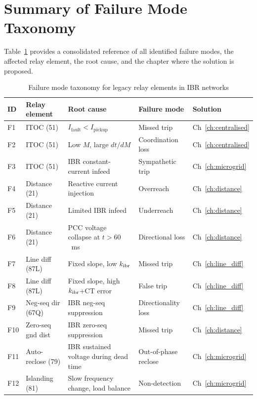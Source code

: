 \section{Summary of Failure Mode Taxonomy}
\label{sec:ch3_taxonomy}

Table~\ref{tab:ch3_failure_modes} provides a consolidated reference of all
identified failure modes, the affected relay element, the root cause,
and the chapter where the solution is proposed.

\begin{table}[htbp]
\caption{Failure mode taxonomy for legacy relay elements in IBR networks}
\label{tab:ch3_failure_modes}
\small
\begin{tabularx}{\textwidth}{@{}lp{2.5cm}p{4.5cm}p{2.5cm}l@{}}
\toprule
ID & Relay element & Root cause & Failure mode & Solution \\
\midrule
F1 & ITOC (51) & $I_\mathrm{fault} < I_\mathrm{pickup}$ & Missed trip & Ch~\ref{ch:centralised} \\
F2 & ITOC (51) & Low $M$, large $dt/dM$ & Coordination loss & Ch~\ref{ch:centralised} \\
F3 & ITOC (51) & IBR constant-current infeed & Sympathetic trip & Ch~\ref{ch:microgrid} \\
F4 & Distance (21) & Reactive current injection & Overreach & Ch~\ref{ch:distance} \\
F5 & Distance (21) & Limited IBR infeed & Underreach & Ch~\ref{ch:distance} \\
F6 & Distance (21) & PCC voltage collapse at $t > 60$~ms & Directional loss & Ch~\ref{ch:distance} \\
F7 & Line diff (87L) & Fixed slope, low $k_{\mathrm{ibr}}$ & Missed trip & Ch~\ref{ch:line_diff} \\
F8 & Line diff (87L) & Fixed slope, high $k_{\mathrm{ibr}}$+CT error & False trip & Ch~\ref{ch:line_diff} \\
F9 & Neg-seq dir (67Q) & IBR neg-seq suppression & Directionality loss & Ch~\ref{ch:line_diff} \\
F10 & Zero-seq gnd dist & IBR zero-seq suppression & Missed trip & Ch~\ref{ch:distance} \\
F11 & Auto-reclose (79) & IBR sustained voltage during dead time & Out-of-phase reclose & Ch~\ref{ch:microgrid} \\
F12 & Islanding (81) & Slow frequency change, load balance & Non-detection & Ch~\ref{ch:microgrid} \\
\bottomrule
\end{tabularx}
\end{table}

